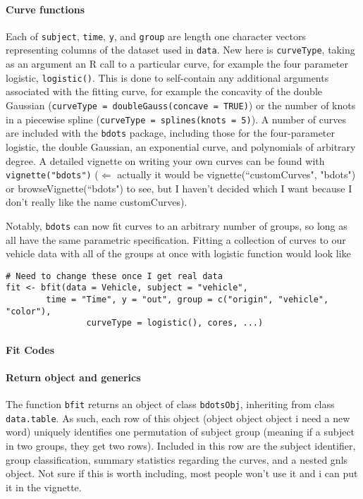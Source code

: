 \documentclass{article}
\begin{document}
\paragraph{Curve functions} Each of \texttt{subject}, \texttt{time}, \texttt{y}, and \texttt{group} are length one character vectors representing columns of the dataset used in \texttt{data}. New here is \texttt{curveType}, taking as an argument an R call to a particular curve, for example the four parameter logistic, \texttt{logistic()}. This is done to self-contain any additional arguments associated with the fitting curve, for example the concavity of the double Gaussian (\texttt{curveType = doubleGauss(concave = TRUE)}) or the number of knots in a piecewise spline (\texttt{curveType = splines(knots = 5)}). A number of curves are included with the \texttt{bdots} package, including those for the four-parameter logistic, the double Gaussian, an exponential curve, and polynomials of arbitrary degree. A detailed vignette on writing your own curves can be found with \texttt{vignette("bdots")} ($\Leftarrow$ actually it would be vignette(``customCurves", "bdots") or browseVignette(``bdots") to see, but I haven't decided which I want because I don't really like the name customCurves).

Notably, \texttt{bdots} can now fit curves to an arbitrary number of groups, so long as all have the same parametric specification. Fitting a collection of curves to our vehicle data with all of the groups at once with logistic function would look like


\begin{center}
\begin{verbatim}
# Need to change these once I get real data
fit <- bfit(data = Vehicle, subject = "vehicle", 
	 	time = "Time", y = "out", group = c("origin", "vehicle", "color"),
	 			curveType = logistic(), cores, ...)
\end{verbatim}
\end{center}

\paragraph{Fit Codes}

\paragraph{Return object and generics}



The function \texttt{bfit} returns an object of class \texttt{bdotsObj}, inheriting from class \texttt{data.table}. As such, each row of this object (object object object i need a new word) uniquely identifies one permutation of subject group (meaning if a subject in two groups, they get two rows). Included in this row are the subject identifier, group classification, summary statistics regarding the curves, and a nested gnls object. Not sure if this is worth including, most people won't use it and i can put it in the vignette.
\end{document}
